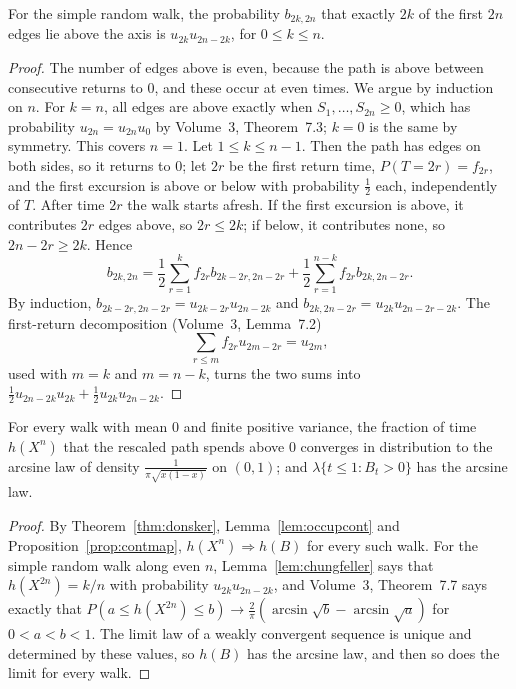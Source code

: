 \begin{lemma}\label{lem:chungfeller}
For the simple random walk, the probability $b_{2k,2n}$ that exactly $2k$ of the first $2n$ edges lie above the axis is $u_{2k}u_{2n-2k}$, for $0\le k\le n$.
\end{lemma}
\begin{proof}
The number of edges above is even, because the path is above between consecutive returns to $0$, and these occur at even times. We argue by induction on $n$. For
$k=n$, all edges are above exactly when $S_1,\dots,S_{2n}\ge0$, which has probability $u_{2n}=u_{2n}u_0$ by Volume~3, Theorem~7.3; $k=0$ is the same by symmetry. This
covers $n=1$. Let $1\le k\le n-1$. Then the path has edges on both sides, so it returns to $0$; let $2r$ be the first return time, $P(T=2r)=f_{2r}$, and the first excursion
is above or below with probability $\frac12$ each, independently of $T$. After time $2r$ the walk starts afresh. If the first excursion is above, it contributes $2r$ edges
above, so $2r\le2k$; if below, it contributes none, so $2n-2r\ge2k$. Hence
\[
b_{2k,2n}=\frac12\sum_{r=1}^kf_{2r}b_{2k-2r,2n-2r}+\frac12\sum_{r=1}^{n-k}f_{2r}b_{2k,2n-2r}.
\]
By induction, $b_{2k-2r,2n-2r}=u_{2k-2r}u_{2n-2k}$ and $b_{2k,2n-2r}=u_{2k}u_{2n-2r-2k}$. The first-return decomposition (Volume~3, Lemma~7.2)
\[
\textstyle\sum_{r\le m}f_{2r}u_{2m-2r}=u_{2m},
\]
used with $m=k$ and $m=n-k$, turns the two sums into $\frac12u_{2n-2k}u_{2k}+\frac12u_{2k}u_{2n-2k}$.
\end{proof}

\begin{theorem}\label{thm:arcsine}
For every walk with mean $0$ and finite positive variance, the fraction of time $h(X^n)$ that the rescaled path spends above $0$ converges in distribution to the
arcsine law of density $\frac1{\pi\sqrt{x(1-x)}}$ on $(0,1)$; and $\lambda\{t\le1:B_t>0\}$ has the arcsine law.
\end{theorem}
\begin{proof}
By Theorem~\ref{thm:donsker}, Lemma~\ref{lem:occupcont} and Proposition~\ref{prop:contmap}, $h(X^n)\Rightarrow h(B)$ for every such walk. For the simple random walk along
even $n$, Lemma~\ref{lem:chungfeller} says that $h(X^{2n})=k/n$ with probability $u_{2k}u_{2n-2k}$, and Volume~3, Theorem~7.7 says exactly that
$P(a\le h(X^{2n})\le b)\to\frac2\pi(\arcsin\sqrt b-\arcsin\sqrt a)$ for $0<a<b<1$. The limit law of a weakly convergent sequence is unique and determined by these values, so
$h(B)$ has the arcsine law, and then so does the limit for every walk.
\end{proof}

